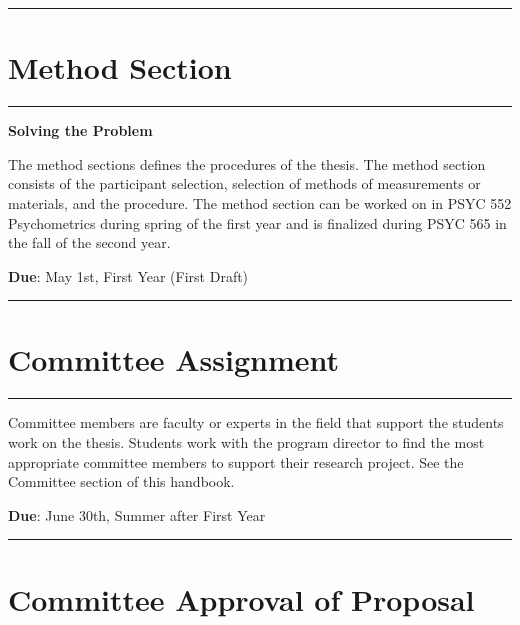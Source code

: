 \documentclass[openany]{book}
\begin{document}
\begin{center}\rule{0.5\linewidth}{0.5pt}\end{center}

\hypertarget{method-section}{%
\section{Method Section}\label{method-section}}

\begin{center}\rule{0.5\linewidth}{0.5pt}\end{center}

\textbf{Solving the Problem}

The method sections defines the procedures of the thesis. The method section consists of the participant selection, selection of methods of measurements or materials, and the procedure. The method section can be worked on in PSYC 552 Psychometrics during spring of the first year and is finalized during PSYC 565 in the fall of the second year.

\textbf{Due}: May 1st, First Year (First Draft)

\begin{center}\rule{0.5\linewidth}{0.5pt}\end{center}

\hypertarget{committee-assignment}{%
\section{Committee Assignment}\label{committee-assignment}}

\begin{center}\rule{0.5\linewidth}{0.5pt}\end{center}

Committee members are faculty or experts in the field that support the students work on the thesis. Students work with the program director to find the most appropriate committee members to support their research project. See the Committee section of this handbook.

\textbf{Due}: June 30th, Summer after First Year

\begin{center}\rule{0.5\linewidth}{0.5pt}\end{center}

\hypertarget{committee-approval-of-proposal}{%
\section{Committee Approval of Proposal}\label{committee-approval-of-proposal}}
\end{document}
